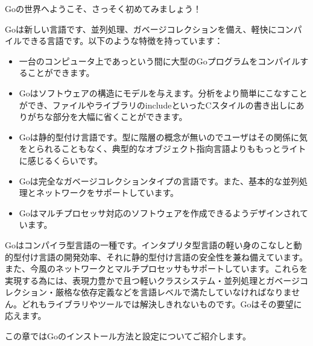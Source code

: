 Goの世界へようこそ、さっそく初めてみましょう！

Goは新しい言語です、並列処理、ガベージコレクションを備え、軽快にコンパイルできる言語です。以下のような特徴を持っています：

\begin{itemize}
  \item 一台のコンピュータ上であっという間に大型のGoプログラムをコンパイルすることができます。
  \item Goはソフトウェアの構造にモデルを与えます。分析をより簡単にこなすことができ、ファイルやライブラリのincludeといったCスタイルの書き出しにありがちな部分を大幅に省くことができます。
  \item Goは静的型付け言語です。型に階層の概念が無いのでユーザはその関係に気をとられることもなく、典型的なオブジェクト指向言語よりももっとライトに感じるくらいです。
  \item Goは完全なガベージコレクションタイプの言語です。また、基本的な並列処理とネットワークをサポートしています。
  \item Goはマルチプロセッサ対応のソフトウェアを作成できるようデザインされています。
\end{itemize}


Goはコンパイラ型言語の一種です。インタプリタ型言語の軽い身のこなしと動的型付け言語の開発効率、それに静的型付け言語の安全性を兼ね備えています。また、今風のネットワークとマルチプロセッサもサポートしています。これらを実現する為には、表現力豊かで且つ軽いクラスシステム・並列処理とガベージコレクション・厳格な依存定義などを言語レベルで満たしていなければなりません。どれもライブラリやツールでは解決しきれないものです。Goはその要望に応えます。

この章ではGoのインストール方法と設定についてご紹介します。

